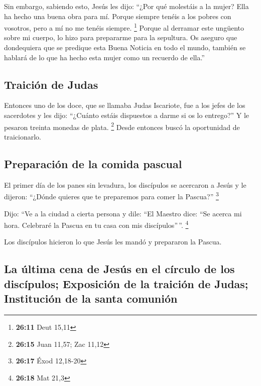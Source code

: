  Sin embargo, sabiendo esto, Jesús les dijo: ``¿Por qué
molestáis a la mujer? Ella ha hecho una buena obra para mí.
 Porque siempre tenéis a los pobres con vosotros, pero a
mí no me tenéis siempre. \footnote{\textbf{26:11} Deut 15,11}
 Porque al derramar este ungüento sobre mi cuerpo, lo
hizo para prepararme para la sepultura.  Os aseguro que
dondequiera que se predique esta Buena Noticia en todo el mundo, también
se hablará de lo que ha hecho esta mujer como un recuerdo de ella.''

\hypertarget{traiciuxf3n-de-judas}{%
\subsection{Traición de Judas}\label{traiciuxf3n-de-judas}}

 Entonces uno de los doce, que se llamaba Judas
Iscariote, fue a los jefes de los sacerdotes  y les dijo:
``¿Cuánto estáis dispuestos a darme si os lo entrego?'' Y le pesaron
treinta monedas de plata. \footnote{\textbf{26:15} Juan 11,57; Zac 11,12}
 Desde entonces buscó la oportunidad de traicionarlo.

\hypertarget{preparaciuxf3n-de-la-comida-pascual}{%
\subsection{Preparación de la comida
pascual}\label{preparaciuxf3n-de-la-comida-pascual}}

 El primer día de los panes sin levadura, los discípulos
se acercaron a Jesús y le dijeron: ``¿Dónde quieres que te preparemos
para comer la Pascua?'' \footnote{\textbf{26:17} Éxod 12,18-20}

 Dijo: ``Ve a la ciudad a cierta persona y dile: ``El
Maestro dice: ``Se acerca mi hora. Celebraré la Pascua en tu casa con
mis discípulos''\,''. \footnote{\textbf{26:18} Mat 21,3}

 Los discípulos hicieron lo que Jesús les mandó y
prepararon la Pascua.

\hypertarget{la-uxfaltima-cena-de-jesuxfas-en-el-cuxedrculo-de-los-discuxedpulos-exposiciuxf3n-de-la-traiciuxf3n-de-judas-instituciuxf3n-de-la-santa-comuniuxf3n}{%
\subsection{La última cena de Jesús en el círculo de los discípulos;
Exposición de la traición de Judas; Institución de la santa
comunión}\label{la-uxfaltima-cena-de-jesuxfas-en-el-cuxedrculo-de-los-discuxedpulos-exposiciuxf3n-de-la-traiciuxf3n-de-judas-instituciuxf3n-de-la-santa-comuniuxf3n}}


